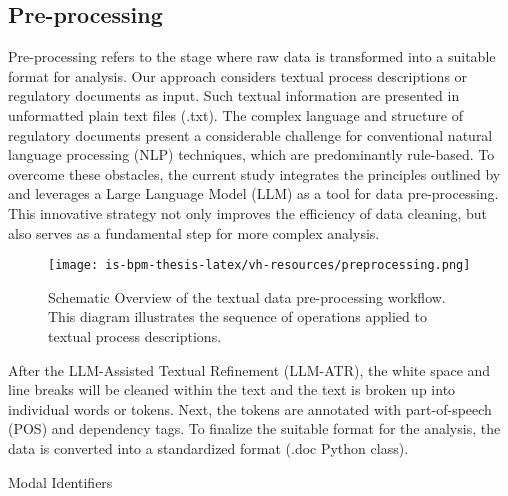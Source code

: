\subsection{Pre-processing} Pre-processing refers to the stage where raw data is transformed into a suitable format for analysis. Our approach considers textual process descriptions or regulatory documents as input. Such textual information are presented in unformatted plain text files (.txt).  The complex language and structure of regulatory documents present a considerable challenge for conventional natural language processing (NLP) techniques, which are predominantly rule-based. To overcome these obstacles, the current study integrates the principles outlined by \cite{zhangLargeLanguageModels2023} and leverages a Large Language Model (LLM) as a tool for data pre-processing. This innovative strategy not only improves the efficiency of data cleaning, but also serves as a fundamental step for more complex analysis.

\begin{figure}
\texttt{[image: is-bpm-thesis-latex/vh-resources/preprocessing.png]}
\caption{Schematic Overview of the textual data pre-processing workflow. This diagram illustrates the sequence of operations applied to textual process descriptions.} \label{fig1}
\end{figure}

After the LLM-Assisted Textual Refinement (LLM-ATR), the white space and line breaks will be cleaned within the text and the text is broken up into individual words or tokens. Next, the tokens are annotated with part-of-speech (POS) and dependency tags. To finalize the suitable format for the analysis, the data is converted into a standardized format (.doc Python class). 


Modal Identifiers







